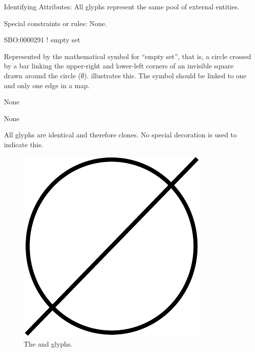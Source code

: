 \begin{glyphDescription}

\item[Identifying Attributes:]\mbox{} All glyphs represent the same
  pool of external entities.

\item[Special constraints or rules:]\mbox{}\newline None.

\glyphSboTerm SBO:0000291 ! empty set

\glyphContainer Represented by the mathematical symbol for ``empty
set'', that is, a circle crossed by a bar linking the upper-right and
lower-left corners of an invisible square drawn around the circle ($\emptyset$).
 illustrates this.  The symbol should be linked to one
and only one edge in a map.

\glyphLabel None

\glyphAux None

\glyphCloning All glyphs are identical and therefore clones. No
special decoration is used to indicate this.

\end{glyphDescription}

\begin{figure}[H]
  \centering
  \includegraphics[scale = 0.3]{images/sourceSink}
  \caption{The  and  glyphs.}
  \label{fig:sourceSink}
\end{figure}







